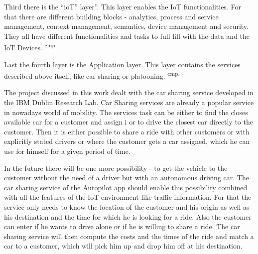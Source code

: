 Third there is the ``ioT'' layer''. This layer enables the IoT functionalities. For that there are different building blocks - analytics, process and service management, context management, semantics, device management and security. They all have different functionalities and tasks to full fill with the data and the IoT Devices. \textsuperscript{cmp.\cite{5}}

Last the fourth layer is the Application layer. This layer contains the services described above itself, like car sharing or platooning. \textsuperscript{cmp.\cite{28}}


The project discussed in this work dealt with the car sharing service developed in the IBM Dublin Research Lab. Car Sharing services are already a popular service in nowadays world of mobility. The services task can be either to find the closes available car for a customer and assign i or to drive the closest car directly to the customer. Then it is either possible to share a ride with other customers or with explicitly stated drivers or where the customer gets a car assigned, which he can use for himself for a given period of time.

In the future there will be one more possibility - to get the vehicle to the customer without the need of a driver but with an autonomous driving car. The car sharing service of the Autopilot app should enable this possibility combined with all the features of the IoT environment like traffic information. For that the service only needs to know the location of the customer and his origin as well as his destination and the time for which he is looking for a ride. Also the customer can enter if he wants to drive alone or if he is willing to share a ride. The car sharing service will then compute the costs and the times of the ride and match a car to a customer, which will pick him up and drop him off at his destination.

